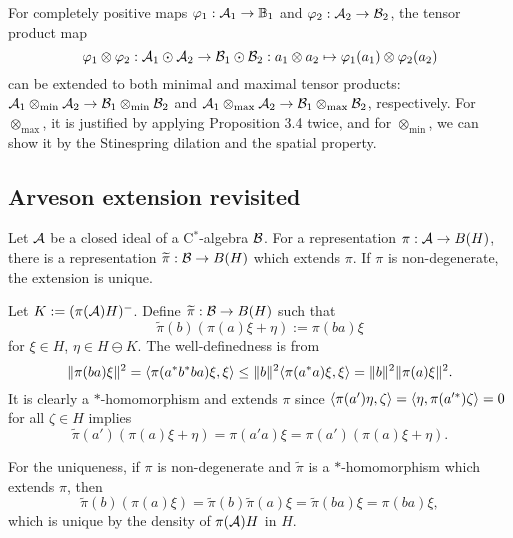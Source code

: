 \documentclass{../../../small}
\begin{document}
\begin{rmk*}
For completely positive maps $\varphi_1:\mathcal{A}_1\to\mathbb{B}_1$ and $\varphi_2:\mathcal{A}_2\to\mathcal{B}_2$, the tensor product map
\[\varphi_1\otimes\varphi_2:\mathcal{A}_1\odot\mathcal{A}_2\to\mathcal{B}_1\odot\mathcal{B}_2:a_1\otimes a_2\mapsto\varphi_1(a_1)\otimes\varphi_2(a_2)\]
can be extended to both minimal and maximal tensor products: $\mathcal{A}_1\otimes_{\min}\mathcal{A}_2\to\mathcal{B}_1\otimes_{\min}\mathcal{B}_2$ and $\mathcal{A}_1\otimes_{\max}\mathcal{A}_2\to\mathcal{B}_1\otimes_{\max}\mathcal{B}_2$, respectively.
For $\otimes_{\max}$, it is justified by applying Proposition 3.4 twice, and for $\otimes_{\min}$, we can show it by the Stinespring dilation and the spatial property.
\end{rmk*}


\subsection{Arveson extension revisited}

\begin{prop}
Let $\mathcal{A}$ be a closed ideal of a C$^*$-algebra $\mathcal{B}$.
For a representation $\pi:\mathcal{A}\to B(H)$, there is a representation $\widetilde\pi:\mathcal{B}\to B(H)$ which extends $\pi$.
If $\pi$ is non-degenerate, the extension is unique.
\end{prop}
\begin{pf}
Let $K:=(\pi(\mathcal{A})H)^-$.
Define $\widetilde\pi:\mathcal{B}\to B(H)$ such that
\[\tilde\pi(b)(\pi(a)\xi+\eta):=\pi(ba)\xi\]
for $\xi\in H$, $\eta\in H\ominus K$.
The well-definedness is from
\[\|\pi(ba)\xi\|^2=\langle\pi(a^*b^*ba)\xi,\xi\rangle\le\|b\|^2\langle\pi(a^*a)\xi,\xi\rangle=\|b\|^2\|\pi(a)\xi\|^2.\]
It is clearly a $*$-homomorphism and extends $\pi$ since $\langle\pi(a')\eta,\zeta\rangle=\langle\eta,\pi(a'^*)\zeta\rangle=0$ for all $\zeta\in H$ implies
\[\tilde\pi(a')(\pi(a)\xi+\eta)=\pi(a'a)\xi=\pi(a')(\pi(a)\xi+\eta).\]

For the uniqueness, if $\pi$ is non-degenerate and $\tilde\pi$ is a $*$-homomorphism which extends $\pi$, then
\[\tilde\pi(b)(\pi(a)\xi)=\tilde\pi(b)\tilde\pi(a)\xi=\tilde\pi(ba)\xi=\pi(ba)\xi,\]
which is unique by the density of $\pi(\mathcal{A})H$ in $H$.
\end{pf}
\end{document}
